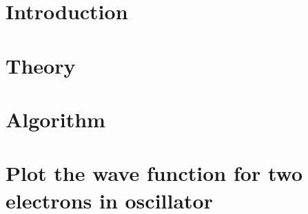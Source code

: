 \documentclass[a4paper,english]{article}
\author{Kristoffer Brækken, Vedad Hodzic, Paul Magnus
Sørensen-Clark}
\begin{document}
\begin{titlepage}
    \thispagestyle{empty}
    
\end{titlepage}

\section{Introduction}


\section{Theory}


\section{Algorithm}


\section{Plot the wave function for two electrons in oscillator}



\end{document}
